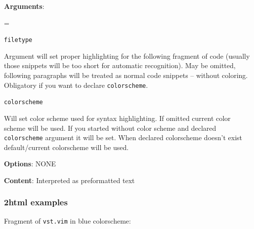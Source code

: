 \documentclass[12pt]{article}
\newenvironment{deflist}[1]{%
\begin{list}{}
{\renewcommand{\makelabel}[1]{\textbf{##1}\hfill}
\settowidth{\labelwidth}{\textbf{#1}}
\leftmargin=\labelwidth
\advance \leftmargin\labelsep}}
{\end{list}}
\begin{document}
\begin{itemize}
\item
\textbf{Arguments}:

 \begin{deflist}{iii}

\item[ \texttt{filetype} ]

Argument will set proper highlighting for the following fragment of
code (usually those snippets will be too short for automatic
recognition). May be omitted, following paragraphs will be treated
as normal code snippets -- without coloring. Obligatory if you want
to declare \texttt{colorscheme}.

\item[ \texttt{colorscheme}]

Will set color scheme used for syntax highlighting. If omitted
current color scheme will be used. If you started without color
scheme and declared \texttt{colorscheme} argument it will be set. When
declared colorscheme doesn't exist default/current colorscheme will
be used.
\end{deflist}

\item
\textbf{Options}: NONE

\item
\textbf{Content}: Interpreted as preformatted text
\end{itemize}
\begin{center}
\end{center}
\hypertarget{l2html-examples}{}
\subsubsection{2html examples}

Fragment of \texttt{vst.vim} in blue colorscheme:
\end{document}
